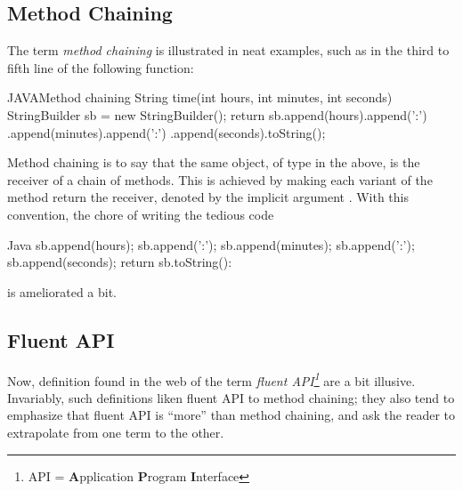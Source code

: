 \subsection{Method Chaining}
The term \emph{method chaining} is illustrated in neat examples, such  
    as in the third to fifth line of the following \Java function: 
\begin{lCode}{JAVA}{Method chaining}
String time(int hours, int minutes, int seconds) { 
  StringBuilder sb  = new StringBuilder();
  return sb.append(hours).append(':')
          .append(minutes).append(':')
          .append(seconds).toString();
}
\end{lCode}
Method chaining is to say that the same object,  of type  in the above, 
   is the receiver of a chain of methods. 
This is achieved by making each variant of the method  return the receiver, denoted by the 
  implicit argument .
With this convention, the chore of writing the tedious code 
\begin{lcode}{Java}
  sb.append(hours);
  sb.append(':');
  sb.append(minutes);
  sb.append(':');
  sb.append(seconds);
  return sb.toString():
\end{lcode}
is ameliorated a bit. 
  
\subsection{Fluent API}
Now, definition found in the web of the term \emph{fluent API\footnote{API =
    \textbf Application \textbf Program \textbf Interface
}} are a bit illusive. 
Invariably, such definitions liken fluent API to method chaining; 
  they also tend to emphasize that fluent API is ``more'' than method
  chaining, and ask the reader to extrapolate from one term to the other.

